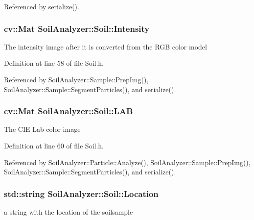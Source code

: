 Referenced by serialize().

\hypertarget{class_soil_analyzer_1_1_soil_a6f56200f2722df5b849d8cddd094c852}{}
\subsubsection[{Intensity}]{\setlength{\rightskip}{0pt plus 5cm}cv\+::\+Mat Soil\+Analyzer\+::\+Soil\+::\+Intensity}\label{class_soil_analyzer_1_1_soil_a6f56200f2722df5b849d8cddd094c852}
The intensity image after it is converted from the R\+G\+B color model 

Definition at line 58 of file Soil.\+h.



Referenced by Soil\+Analyzer\+::\+Sample\+::\+Prep\+Img(), Soil\+Analyzer\+::\+Sample\+::\+Segment\+Particles(), and serialize().

\hypertarget{class_soil_analyzer_1_1_soil_a59ee773ff73380a12b1c2af3b86f6638}{}
\subsubsection[{L\+A\+B}]{\setlength{\rightskip}{0pt plus 5cm}cv\+::\+Mat Soil\+Analyzer\+::\+Soil\+::\+L\+A\+B}\label{class_soil_analyzer_1_1_soil_a59ee773ff73380a12b1c2af3b86f6638}
The C\+I\+E Lab color image 

Definition at line 60 of file Soil.\+h.



Referenced by Soil\+Analyzer\+::\+Particle\+::\+Analyze(), Soil\+Analyzer\+::\+Sample\+::\+Prep\+Img(), Soil\+Analyzer\+::\+Sample\+::\+Segment\+Particles(), and serialize().

\hypertarget{class_soil_analyzer_1_1_soil_a9c3cabd71691bfc4bb56d32fdb298e72}{}
\subsubsection[{Location}]{\setlength{\rightskip}{0pt plus 5cm}std\+::string Soil\+Analyzer\+::\+Soil\+::\+Location}\label{class_soil_analyzer_1_1_soil_a9c3cabd71691bfc4bb56d32fdb298e72}
a string with the location of the soilsample 

